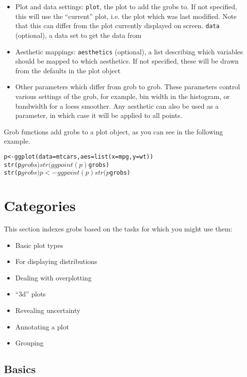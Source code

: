 \begin{itemize}
	\item Plot and data settings: {\tt plot}, the plot to add the grobs to. If not specified, this will use the ``current'' plot, i.e. the plot which was last modified. Note that this can differ from the plot currently displayed on screen.  {\tt data} (optional), a data set to get the data from
	\item Aesthetic mappings: {\tt aesthetics} (optional), a list describing which variables should be mapped to which aesthetics.  If not specified, these will be drawn from the defaults in the plot object
	\item Other parameters which differ from grob to grob.  These parameters control various settings of the grob, for example, bin width in the histogram, or bandwidth for a loess smoother.  Any aesthetic can also be used as a parameter, in which case it will be applied to all points.
\end{itemize}

Grob functions add grobs to a plot object, as you can see in the following example.

\begin{alltt}
p <- ggplot(data=mtcars, aes=list(x=mpg, y=wt))
str(p$grobs) 
str(ggpoint(p)$grobs)
str(p$grobs)
p <- ggpoint(p)
str(p$grobs)
\end{alltt}

\section{Categories}\label{sec:categories}

This section indexes grobs based on the tasks for which you might use them: 

\begin{itemize}
	\item Basic plot types
	\item For displaying distributions
	\item Dealing with overplotting
	\item ``3d'' plots
	\item Revealing uncertainty
	\item Annotating a plot
	\item Grouping
\end{itemize}


\subsection{Basics}\label{sub:basics}

